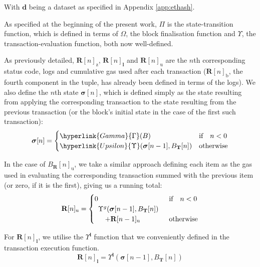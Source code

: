 \documentclass[9pt,oneside]{amsart}
\begin{document}
\begin{multicols}{2}
With $\mathbf{d}$ being a dataset as specified in Appendix \ref{app:ethash}.

As specified at the beginning of the present work, \hyperlink{Pi}{$\Pi$} is the state-transition function, which is defined in terms of \hyperlink{Omega}{$\Omega$}, the block finalisation function and \hyperlink{Upsilon_state_transition}{$\Upsilon$}, the transaction-evaluation function, both now well-defined.

As previously detailed, $\mathbf{R}[n]_{\mathrm{z}}$, $\mathbf{R}[n]_{\mathbf{l}}$ and $\mathbf{R}[n]_{\mathrm{u}}$ are the $n$th corresponding status code, logs and cumulative gas used after each transaction ($\mathbf{R}[n]_{\mathrm{b}}$, the fourth component in the tuple, has already been defined in terms of the logs). We also define the $n$th state $\boldsymbol{\sigma}[n]$, which is defined simply as the state resulting from applying the corresponding transaction to the state resulting from the previous transaction (or the block's initial state in the case of the first such transaction):
\begin{equation}
\boldsymbol{\sigma}[n] = \begin{cases} \hyperlink{Gamma}{\Gamma}(B) & \text{if} \quad n < 0 \\ \hyperlink{Upsilon}{\Upsilon}(\boldsymbol{\sigma}[n - 1], B_{\mathbf{T}}[n]) & \text{otherwise} \end{cases}
\end{equation}

In the case of $B_{\mathbf{R}}[n]_{\mathrm{u}}$, we take a similar approach defining each item as the gas used in evaluating the corresponding transaction summed with the previous item (or zero, if it is the first), giving us a running total:
\begin{equation}
\mathbf{R}[n]_{\mathrm{u}} = \begin{cases} 0 & \text{if} \quad n < 0 \\
\begin{array}[b]{l}
\Upsilon^g(\boldsymbol{\sigma}[n - 1], B_{\mathbf{T}}[n])\\ \quad + \mathbf{R}[n-1]_{\mathrm{u}}
\end{array}
 & \text{otherwise} \end{cases}
\end{equation}

For $\mathbf{R}[n]_{\mathbf{l}}$, we utilise the \hyperlink{Upsilon_pow_l}{$\Upsilon^\mathbf{l}$} function that we conveniently defined in the transaction execution function.
\begin{equation}
\mathbf{R}[n]_{\mathbf{l}} =
\Upsilon^{\mathbf{l}}(\boldsymbol{\sigma}[n - 1], B_{\mathbf{T}}[n])
\end{equation}


\end{multicols}
\end{document}
